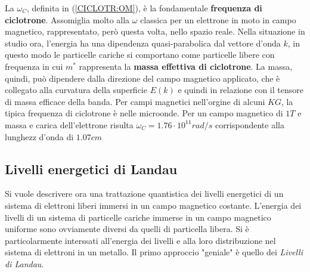 La $\omega_C$, definita in (\ref{CICLOTR:OM}), \`e la fondamentale \textbf{frequenza di ciclotrone}. Assomiglia molto alla $\omega$  classica per un elettrone in moto in campo magnetico, rappresentato, per\`o questa volta, nello spazio reale. 
Nella situazione in studio ora, l'energia ha una dipendenza quasi-parabolica dal vettore d'onda $k$, in questo modo le particelle cariche si comportano come particelle libere con frequenza
in cui $m^*$ rappresenta la \textbf{massa effettiva di ciclotrone}. La massa, quindi, pu\`o dipendere dalla direzione del campo magnetico applicato, che \`e collegato alla curvatura della superficie $E(k)$ e quindi in relazione con il tensore di massa efficace della banda.
Per campi magnetici nell'orgine di alcuni $KG$, la tipica frequenza di ciclotrone \`e nelle microonde. Per un campo magnetico di $1T$ e massa e carica dell'elettrone risulta $\omega_C=1.76\cdot10^{11} rad/s$ corrispondente alla lunghezz d'onda di $1.07cm$
\subsection{Livelli energetici di Landau}
Si vuole descrivere ora una trattazione quantistica dei livelli energetici di un sistema di elettroni liberi immersi in un campo magnetico costante. L'energia dei livelli di un sistema di particelle cariche immerse in un campo magnetico uniforme sono ovviamente diversi da quelli di particella libera. Si \`e particolarmente interssati all'energia dei livelli e alla loro distribuzione  nel sistema di elettroni in un metallo. Il primo approccio "geniale" \`e quello dei \textit{Livelli di Landau}.

